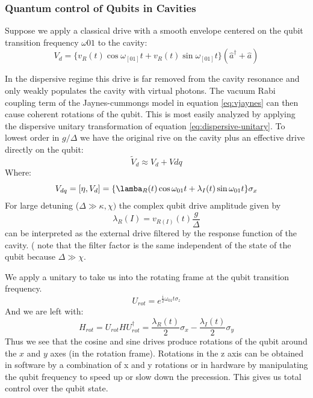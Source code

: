 \documentclass[12pt]{article}
\numberwithin{equation}{subsection}
\newcommand\ask[1]{
{%
}
}
\newcommand\page[1]{
{
}
}
\begin{document}
\ask{In this page he lists some other works and their acomplishments. Should I delve into it or leave it out?}

\page{83/90}
\subsubsection{Quantum control of Qubits in Cavities}
Suppose we apply a classical drive with a smooth envelope centered on the qubit transition frequency $\omega{01}$ to the cavity:
\begin{equation}
    V_d = \{v_R(t)\cos\omega_[01]t + v_R(t)\sin\omega_[01]t \} (\hat a^\dagger + \hat a)
\end{equation}

In the dispersive regime this drive is far removed from the cavity resonance and only weakly populates the cavity with virtual photons. The vacuum Rabi coupling term of the Jaynes-cummongs model in equation \ref{eq:vjaynes} can then cause coherent rotations of the qubit. This is most easily analyzed by applying the dispersive unitary transformation of equation \ref{eq:dispersive-unitary}. To lowest order in $g/\Delta$ we have the original rive on the cavity plus an effective drive directly on the qubit:
\begin{equation}
\tilde V_d \approx V_d+V{dq}
\end{equation}
Where:
\begin{equation}
    V_{dq} = [\eta, V_d] = \{ \lamba_R(t) \cos\omega_{01} t + \lambda_I(t)\sin\omega_{01} t   \} \sigma_x
\end{equation}
For large detuning ($\Delta \gg \kappa, \chi)$  the complex qubit drive amplitude given by
\begin{equation}
    \lambda_R(I) = v_{R(I)} (t) \frac{g}{\Delta}
\end{equation}
can be interpreted as the external drive filtered by the response function of the cavity. ( note that the filter factor is the same independent of the state of the qubit because $\Delta \gg \chi$.

We apply a unitary to take us into the rotating frame at the qubit transition frequency.
\begin{equation}
    U_{rot} = e^{\frac{i}{2} \omega_{01}t \sigma_z}
\end{equation}
And we are left with:
\begin{equation}
    H_{rot} = U_{rot} H U_{rot}^\dagger = \frac{\lambda_R(t)}{2} \sigma_x - \frac{\lambda_I(t)}{2} \sigma_y
\end{equation}
Thus we see that the cosine and sine drives produce rotations of the qubit around the $x$ and $y$ axes (in the rotation frame). Rotations in the z axis can be obtained in software by a combination of x and y rotations or in hardware by manipulating the qubit frequency to speed up or slow down the precession.
This gives us total control over the qubit state. %
\end{document}
